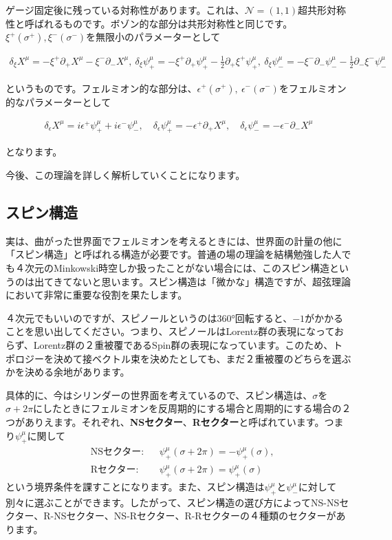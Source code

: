 \documentclass[report,paper=a4, fontsize=12pt, line_length=16cm, number_of_lines=33,dvipdfmx]{jlreq}
\newenvironment{important}{\begin{tcolorbox}[
  colback = white,
  colframe = red!35,
  boxrule = 2mm,
  fonttitle = \bfseries,
  after = \noindent] }{\end{tcolorbox}}
\numberwithin{equation}{chapter}
\numberwithin{equation}{section}
\newcommand{\Ncal}{\mathcal{N}}
\newcommand{\del}{\partial}
\newcommand{\kyou}[1]{{\sffamily \bfseries #1}}
\begin{document}
ゲージ固定後に残っている対称性があります。これは、$\Ncal=(1,1)$超共形対称性と呼ばれるものです。ボゾン的な部分は共形対称性と同じです。$\xi^{+}(\sigma^{+}),\xi^{-}(\sigma^{-})$を無限小のパラメーターとして
\begin{important}
  \begin{align}
    \delta_{\xi}X^{\mu}=-\xi^{+}\del_{+}X^{\mu}-\xi^{-}\del_{-}X^{\mu},\ 
    \delta_{\xi}\psi^{\mu}_{+}=-\xi^{+}\del_{+}\psi^{\mu}_{+}-\frac12 \del_{+}\xi^{+}\psi^{\mu}_{+},\ 
    \delta_{\xi}\psi^{\mu}_{-}=-\xi^{-}\del_{-}\psi^{\mu}_{-}-\frac12 \del_{-}\xi^{-}\psi^{\mu}_{-}
  \end{align}    
\end{important}
というものです。フェルミオン的な部分は、$\epsilon^{+}(\sigma^{+}),\ \epsilon^{-}(\sigma^{-})$をフェルミオン的なパラメーターとして
\begin{important}
  \begin{align}
    \delta_{\epsilon}X^{\mu}=i\epsilon^{+}\psi^{\mu}_{+}+i\epsilon^{-}\psi^{\mu}_{-}
    ,\quad
    \delta_{\epsilon}\psi^{\mu}_{+}=-\epsilon^{+}\del_{+}X^{\mu}
    ,\quad
    \delta_{\epsilon}\psi^{\mu}_{-}=-\epsilon^{-}\del_{-}X^{\mu}
    \label{superresidualtransformation}
  \end{align}    
\end{important}
となります。

今後、この理論を詳しく解析していくことになります。

\subsection{スピン構造}

実は、曲がった世界面でフェルミオンを考えるときには、世界面の計量の他に「スピン構造」と呼ばれる構造が必要です。普通の場の理論を結構勉強した人でも４次元のMinkowski時空しか扱ったことがない場合には、このスピン構造というのは出てきてないと思います。スピン構造は「微かな」構造ですが、超弦理論において非常に重要な役割を果たします。

４次元でもいいのですが、スピノールというのは360°回転すると、$-1$がかかることを思い出してください。つまり、スピノールはLorentz群の表現になっておらず、Lorentz群の２重被覆であるSpin群の表現になっています。このため、トポロジーを決めて接ベクトル束を決めたとしても、まだ２重被覆のどちらを選ぶかを決める余地があります。

具体的に、今はシリンダーの世界面を考えているので、スピン構造は、$\sigma$を$\sigma+2\pi$にしたときにフェルミオンを反周期的にする場合と周期的にする場合の２つがありえます。それぞれ、\kyou{NSセクター}、\kyou{Rセクター}と呼ばれています。つまり$\psi^{\mu}_{+}$に関して
\begin{align}
  &\text{NSセクター:}&& \psi^{\mu}_{+}(\sigma+2\pi)=-\psi^{\mu}_{+}(\sigma),\\
  &\text{Rセクター:}&& \psi^{\mu}_{+}(\sigma+2\pi)=\psi^{\mu}_{+}(\sigma) 
\end{align}
という境界条件を課すことになります。また、スピン構造は$\psi^{\mu}_{+}$と$\psi^{\mu}_{-}$に対して別々に選ぶことができます。したがって、スピン構造の選び方によってNS-NSセクター、R-NSセクター、NS-Rセクター、R-Rセクターの４種類のセクターがあります。
\end{document}

